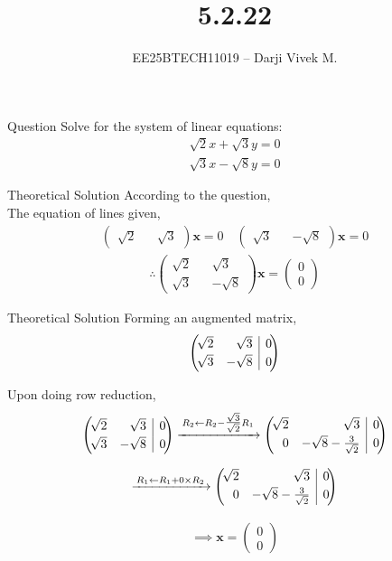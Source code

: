 \documentclass{beamer}
\title{5.2.22}
\author{EE25BTECH11019 -- Darji Vivek M.}
\date{}
\makeatletter
\newcommand{\myvec}[1]{\begin{pmatrix}#1\end{pmatrix}}
\newcommand{\augvec}[3]{%
  \left(\!\begin{array}{@{}*{#1}{r}|r@{}}#3\end{array}\!\right)
}
\renewcommand{\vec}[1]{\mathbf{#1}}
\makeatother
\begin{document}
\begin{frame}
\begin{titlepage}

\end{titlepage}
\end{frame}

\begin{frame}{Question}
Solve for the system of linear equations:
\begin{align*}
    \sqrt{2}x+\sqrt{3}y=0\\
    \sqrt{3}x-\sqrt{8}y=0
\end{align*}
\end{frame}

\begin{frame}{Theoretical Solution}
According to the question,\\
The equation of lines given,
\begin{align}
    \myvec{\sqrt{2}&&\sqrt{3}}\vec{x}=0 \quad \myvec{\sqrt{3}&&-\sqrt{8}}\vec{x}=0
\end{align}
\begin{align}
    \therefore \myvec{\sqrt{2}&&\sqrt{3}\\\sqrt{3}&&-\sqrt{8}}\vec{x}=\myvec{0\\0}
\end{align}
\end{frame}

\begin{frame}{Theoretical Solution}
Forming an augmented matrix,
\[
    \augvec{2}{1}{\sqrt{2} & \sqrt{3} & 0 \\[2pt] \sqrt{3} & -\sqrt{8} & 0}
\]

Upon doing row reduction,
\[
    \augvec{2}{1}{\sqrt{2} & \sqrt{3} & 0 \\[2pt] \sqrt{3} & -\sqrt{8} & 0}
    \xrightarrow{\,R_2 \gets R_2 - \tfrac{\sqrt{3}}{\sqrt{2}} R_1\,}
    \augvec{2}{1}{\sqrt{2} & \sqrt{3} & 0 \\[2pt] 0 & -\sqrt{8}-\tfrac{3}{\sqrt{2}} & 0}
\]

\[
    \xrightarrow{\,R_1 \gets R_1 + 0\times R_2\,}
    \augvec{2}{1}{\sqrt{2} & \sqrt{3} & 0 \\[2pt] 0 & -\sqrt{8}-\tfrac{3}{\sqrt{2}} & 0}
\]

\begin{align}
    \implies \vec{x}=\myvec{0\\0}
\end{align}
\end{frame}
\end{document}
